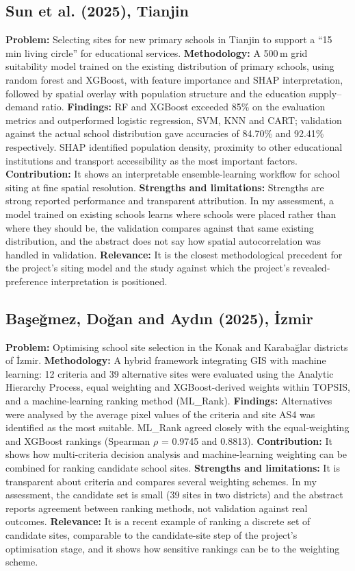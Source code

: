 \documentclass[journal]{IEEEtran}
\begin{document}
\subsection{Sun et al. (2025), Tianjin \cite{tianjin2025}}
\textbf{Problem:} Selecting sites for new primary schools in Tianjin to support a ``15 min living circle'' for educational services.
\textbf{Methodology:} A 500\,m grid suitability model trained on the existing distribution of primary schools, using random forest and XGBoost, with feature importance and SHAP interpretation, followed by spatial overlay with population structure and the education supply--demand ratio.
\textbf{Findings:} RF and XGBoost exceeded 85\% on the evaluation metrics and outperformed logistic regression, SVM, KNN and CART; validation against the actual school distribution gave accuracies of 84.70\% and 92.41\% respectively. SHAP identified population density, proximity to other educational institutions and transport accessibility as the most important factors.
\textbf{Contribution:} It shows an interpretable ensemble-learning workflow for school siting at fine spatial resolution.
\textbf{Strengths and limitations:} Strengths are strong reported performance and transparent attribution. In my assessment, a model trained on existing schools learns where schools were placed rather than where they should be, the validation compares against that same existing distribution, and the abstract does not say how spatial autocorrelation was handled in validation.
\textbf{Relevance:} It is the closest methodological precedent for the project's siting model and the study against which the project's revealed-preference interpretation is positioned.

\subsection{Ba\c{s}e\u{g}mez, Do\u{g}an and Ayd\i{}n (2025), \.{I}zmir \cite{schoolsiting2025}}
\textbf{Problem:} Optimising school site selection in the Konak and Karaba\u{g}lar districts of \.{I}zmir.
\textbf{Methodology:} A hybrid framework integrating GIS with machine learning: 12 criteria and 39 alternative sites were evaluated using the Analytic Hierarchy Process, equal weighting and XGBoost-derived weights within TOPSIS, and a machine-learning ranking method (ML\_Rank).
\textbf{Findings:} Alternatives were analysed by the average pixel values of the criteria and site AS4 was identified as the most suitable. ML\_Rank agreed closely with the equal-weighting and XGBoost rankings (Spearman $\rho$ = 0.9745 and 0.8813).
\textbf{Contribution:} It shows how multi-criteria decision analysis and machine-learning weighting can be combined for ranking candidate school sites.
\textbf{Strengths and limitations:} It is transparent about criteria and compares several weighting schemes. In my assessment, the candidate set is small (39 sites in two districts) and the abstract reports agreement between ranking methods, not validation against real outcomes.
\textbf{Relevance:} It is a recent example of ranking a discrete set of candidate sites, comparable to the candidate-site step of the project's optimisation stage, and it shows how sensitive rankings can be to the weighting scheme.
\end{document}

